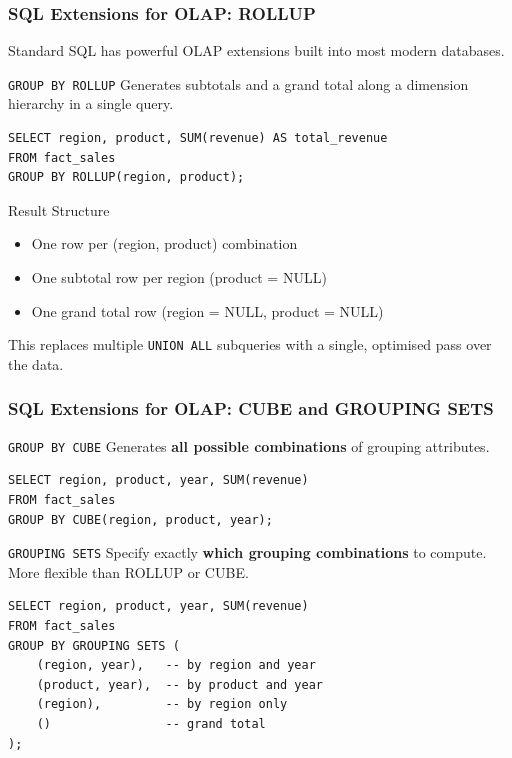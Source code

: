 \begin{frame}[fragile]
  \frametitle{SQL Extensions for OLAP: ROLLUP}

  Standard SQL has powerful OLAP extensions built into most modern databases.

  \begin{block}{\texttt{GROUP BY ROLLUP}}
    Generates subtotals and a grand total along a dimension hierarchy
    in a single query.
  \end{block}

  \begin{lstlisting}[style=sqlstyle]
SELECT region, product, SUM(revenue) AS total_revenue
FROM fact_sales
GROUP BY ROLLUP(region, product);
  \end{lstlisting}

  \begin{block}{Result Structure}
    \begin{itemize}
      \item One row per (region, product) combination
      \item One subtotal row per region (product = NULL)
      \item One grand total row (region = NULL, product = NULL)
    \end{itemize}
    This replaces multiple \texttt{UNION ALL} subqueries with a single,
    optimised pass over the data.
  \end{block}
\end{frame}

\begin{frame}[fragile]
  \frametitle{SQL Extensions for OLAP: CUBE and GROUPING SETS}

  \begin{block}{\texttt{GROUP BY CUBE}}
    Generates \textbf{all possible combinations} of grouping attributes.
  \end{block}

  \begin{lstlisting}[style=sqlstyle]
SELECT region, product, year, SUM(revenue)
FROM fact_sales
GROUP BY CUBE(region, product, year);
  \end{lstlisting}

  \begin{block}{\texttt{GROUPING SETS}}
    Specify exactly \textbf{which grouping combinations} to compute.
    More flexible than ROLLUP or CUBE.
  \end{block}

  \begin{lstlisting}[style=sqlstyle]
SELECT region, product, year, SUM(revenue)
FROM fact_sales
GROUP BY GROUPING SETS (
    (region, year),   -- by region and year
    (product, year),  -- by product and year
    (region),         -- by region only
    ()                -- grand total
);
  \end{lstlisting}
\end{frame}

